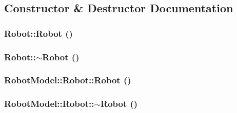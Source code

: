 \subsection{Constructor \& Destructor Documentation}
\hypertarget{class_robot_model_1_1_robot_a4fc7c70ae20623f05e06f2ecb388b6c4}{
\subsubsection[{Robot}]{\setlength{\rightskip}{0pt plus 5cm}Robot::Robot ()}}
\label{class_robot_model_1_1_robot_a4fc7c70ae20623f05e06f2ecb388b6c4}
\hypertarget{class_robot_model_1_1_robot_a924320124b09c2f2ac1621aa210d5f38}{
\subsubsection[{$\sim$Robot}]{\setlength{\rightskip}{0pt plus 5cm}Robot::$\sim$Robot ()}}
\label{class_robot_model_1_1_robot_a924320124b09c2f2ac1621aa210d5f38}
\hypertarget{class_robot_model_1_1_robot_a22e9262b6ee5252f9a5171b004879b4b}{
\subsubsection[{Robot}]{\setlength{\rightskip}{0pt plus 5cm}RobotModel::Robot::Robot ()}}
\label{class_robot_model_1_1_robot_a22e9262b6ee5252f9a5171b004879b4b}
\hypertarget{class_robot_model_1_1_robot_add0b7a3958eb4afd56983a56cc31dbfc}{
\subsubsection[{$\sim$Robot}]{\setlength{\rightskip}{0pt plus 5cm}RobotModel::Robot::$\sim$Robot ()}}
\label{class_robot_model_1_1_robot_add0b7a3958eb4afd56983a56cc31dbfc}



